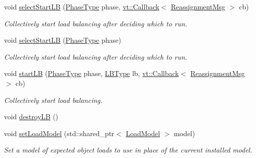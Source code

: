 \begin{DoxyCompactItemize}
void \hyperlink{structvt_1_1vrt_1_1collection_1_1balance_1_1_l_b_manager_acf2b5982f927c631c4ac9bd6627105ce}{select\+Start\+LB} (\hyperlink{namespacevt_a46ce6733d5cdbd735d561b7b4029f6d7}{Phase\+Type} phase, \hyperlink{namespacevt_a36db99df4c973d48b1118a293fff533f}{vt\+::\+Callback}$<$ \hyperlink{structvt_1_1vrt_1_1collection_1_1balance_1_1_reassignment_msg}{Reassignment\+Msg} $>$ cb)
\begin{DoxyCompactList}\small\item\em Collectively start load balancing after deciding which to run. \end{DoxyCompactList}\item 
void \hyperlink{structvt_1_1vrt_1_1collection_1_1balance_1_1_l_b_manager_aa21017c4513b87dccff2c3f0b12b00b4}{select\+Start\+LB} (\hyperlink{namespacevt_a46ce6733d5cdbd735d561b7b4029f6d7}{Phase\+Type} phase)
\begin{DoxyCompactList}\small\item\em Collectively start load balancing after deciding which to run. \end{DoxyCompactList}\item 
void \hyperlink{structvt_1_1vrt_1_1collection_1_1balance_1_1_l_b_manager_a9d93ed4b02b05ff1ed993ce2c6e92356}{start\+LB} (\hyperlink{namespacevt_a46ce6733d5cdbd735d561b7b4029f6d7}{Phase\+Type} phase, \hyperlink{namespacevt_1_1vrt_1_1collection_1_1balance_ac4f99693509affcc67db182d4aad9b5c}{L\+B\+Type} lb, \hyperlink{namespacevt_a36db99df4c973d48b1118a293fff533f}{vt\+::\+Callback}$<$ \hyperlink{structvt_1_1vrt_1_1collection_1_1balance_1_1_reassignment_msg}{Reassignment\+Msg} $>$ cb)
\begin{DoxyCompactList}\small\item\em Collectively start load balancing. \end{DoxyCompactList}\item 
void \hyperlink{structvt_1_1vrt_1_1collection_1_1balance_1_1_l_b_manager_ab66d9e597749a0a798278469f6afbd5b}{destroy\+LB} ()
\item 
void \hyperlink{structvt_1_1vrt_1_1collection_1_1balance_1_1_l_b_manager_a57813a70e0395907021a14c9e2bc1916}{set\+Load\+Model} (std\+::shared\+\_\+ptr$<$ \hyperlink{structvt_1_1vrt_1_1collection_1_1balance_1_1_load_model}{Load\+Model} $>$ model)
\begin{DoxyCompactList}\small\item\em Set a model of expected object loads to use in place of the current installed model. \end{DoxyCompactList}\item 

\end{DoxyCompactItemize}
